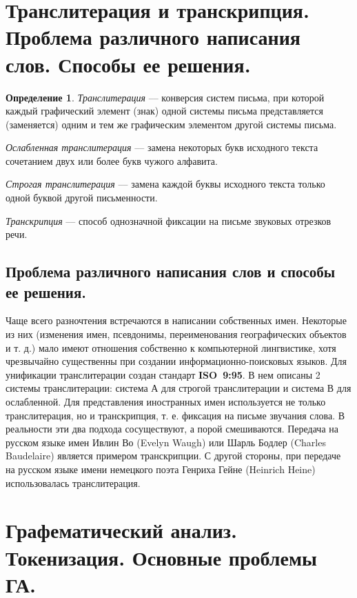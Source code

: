 \documentclass[12pt]{article}
\theoremstyle{definition}
\newtheorem*{defn}{Определение}
\theoremstyle{remark}
\numberwithin{equation}{section}
\begin{document}
\section{Транслитерация и транскрипция. Проблема различного написания слов. Способы ее решения.}
\begin{defn}
\textit{Транслитерация} --– конверсия систем письма, при которой каждый графический элемент (знак) одной системы письма представляется (заменяется) одним и тем же графическим элементом другой системы письма.

\textit{Ослабленная транслитерация} --– замена некоторых букв исходного текста сочетанием двух или более букв чужого алфавита.

\textit{Строгая транслитерация} --– замена каждой буквы исходного текста только одной буквой другой письменности.

\textit{Транскрипция} --– способ однозначной фиксации на письме звуковых отрезков речи.
\end{defn}

\subsection{Проблема различного написания слов и способы ее решения.}
Чаще всего разночтения встречаются в написании собственных имен. Некоторые из них (изменения имен, псевдонимы, переименования географических объектов и т. д.) мало имеют отношения собственно к компьютерной лингвистике, хотя чрезвычайно существенны при создании информационно\nobreakdash-поисковых языков.
Для унификации транслитерации создан стандарт \textbf{ISO~9:95}. В нем описаны 2 системы транслитерации: система А для строгой транслитерации и система В для ослабленной.
Для представления иностранных имен используется не только транслитерация, но и транскрипция, т. е. фиксация на письме звучания слова. В реальности эти два подхода сосуществуют, а порой смешиваются.
Передача на русском языке имен Ивлин Во (Evelyn Waugh) или Шарль Бодлер (Charles Baudelaire) является примером транскрипции. С другой стороны, при передаче на русском языке имени немецкого поэта Генриха Гейне (Heinrich Heine) использовалась транслитерация.

\section{Графематический анализ. Токенизация. Основные проблемы ГА.}
\end{document}
